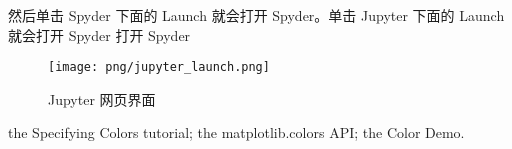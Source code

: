\documentclass[main.tex]{subfiles}
\begin{document}
	然后单击 Spyder 下面的 Launch 就会打开 Spyder。单击 Jupyter 下面的 Launch 就会打开 Spyder
打开 Spyder
\begin{figure}[h]
	\centering
	\texttt{[image: png/jupyter\_launch.png]}
	\caption{Jupyter 网页界面}
	\label{fig:2.4.1}
\end{figure}


the Specifying Colors tutorial;
the matplotlib.colors API;
the Color Demo.
\end{document}
